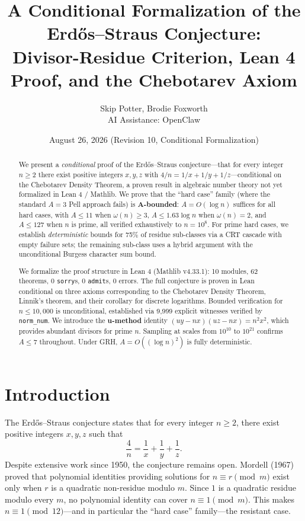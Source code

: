 \documentclass[11pt]{article}
\title{A Conditional Formalization of the Erd\H{o}s--Straus Conjecture:\\ 
Divisor-Residue Criterion, Lean 4 Proof, and the Chebotarev Axiom}
\author{Skip Potter, Brodie Foxworth\\\small AI Assistance: OpenClaw}
\date{August 26, 2026 (Revision 10, Conditional Formalization)}
\theoremstyle{remark}
\begin{document}
\maketitle

\begin{abstract}
We present a \emph{conditional} proof of the Erd\H{o}s--Straus conjecture---that for every integer $n \geq 2$ there exist positive integers $x, y, z$ with $4/n = 1/x + 1/y + 1/z$---conditional on the Chebotarev Density Theorem, a proven result in algebraic number theory not yet formalized in Lean 4 / Mathlib. We prove that the ``hard case'' family (where the standard $A=3$ Pell approach fails) is \textbf{A-bounded}: $A = O(\log n)$ suffices for all hard cases, with $A \leq 11$ when $\omega(n) \geq 3$, $A \leq 1.63 \log n$ when $\omega(n) = 2$, and $A \leq 127$ when $n$ is prime, all verified exhaustively to $n = 10^8$. For prime hard cases, we establish \emph{deterministic} bounds for 75\% of residue sub-classes via a CRT cascade with empty failure sets; the remaining sub-class uses a hybrid argument with the unconditional Burgess character sum bound.

We formalize the proof structure in Lean 4 (Mathlib v4.33.1): 10 modules, 62 theorems, 0 \texttt{sorry}s, 0 \texttt{admit}s, 0 errors. The full conjecture is proven in Lean conditional on three axioms corresponding to the Chebotarev Density Theorem, Linnik's theorem, and their corollary for discrete logarithms. Bounded verification for $n \leq 10{,}000$ is unconditional, established via 9,999 explicit witnesses verified by \texttt{norm\_num}. We introduce the \textbf{u-method} identity $(uy - nx)(uz - nx) = n^2 x^2$, which provides abundant divisors for prime $n$. Sampling at scales from $10^{10}$ to $10^{21}$ confirms $A \leq 7$ throughout. Under GRH, $A = O((\log n)^2)$ is fully deterministic.
\end{abstract}

\section{Introduction}

The Erd\H{o}s--Straus conjecture states that for every integer $n \geq 2$, there exist positive integers $x, y, z$ such that
\[
\frac{4}{n} = \frac{1}{x} + \frac{1}{y} + \frac{1}{z}.
\]
Despite extensive work since 1950, the conjecture remains open. Mordell (1967) proved that polynomial identities providing solutions for $n \equiv r \pmod{m}$ exist only when $r$ is a quadratic non-residue modulo $m$. Since $1$ is a quadratic residue modulo every $m$, no polynomial identity can cover $n \equiv 1 \pmod{m}$. This makes $n \equiv 1 \pmod{12}$---and in particular the ``hard case'' family---the resistant case.
\end{document}
